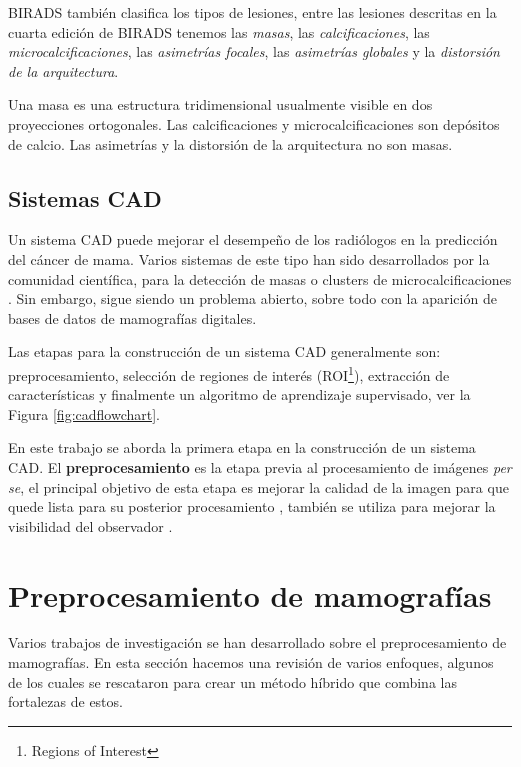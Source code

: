 BIRADS también clasifica los tipos de lesiones, entre las lesiones descritas en
la cuarta edición de BIRADS tenemos las \textit{masas}, las
\textit{calcificaciones}, las \textit{microcalcificaciones}, las
\textit{asimetrías focales}, las \textit{asimetrías globales} y la
\textit{distorsión de la arquitectura}. 

Una masa es una estructura tridimensional usualmente visible en dos
proyecciones ortogonales. Las calcificaciones y microcalcificaciones son
depósitos de calcio. Las asimetrías y la distorsión de la arquitectura no son
masas.

\subsection{Sistemas CAD}

Un sistema CAD puede mejorar el desempeño de los radiólogos en la predicción
del cáncer de mama. Varios sistemas de este tipo han sido desarrollados por la
comunidad científica, para la detección de masas \cite{bellotti2006completely}
o clusters de microcalcificaciones \cite{yu2000cad}. Sin embargo, sigue siendo
un problema abierto, sobre todo con la aparición de bases de datos de
mamografías digitales.

\cite{bozek2009survey}

Las etapas para la construcción de un sistema CAD generalmente son:
preprocesamiento, selección de regiones de interés (ROI\footnote{Regions of
Interest}), extracción de características y finalmente un algoritmo de
aprendizaje supervisado, ver la Figura \ref{fig:cadflowchart}.

\shorthandoff{>} %
    
\shorthandon{>} 

En este trabajo se aborda la primera etapa en la construcción de un sistema
CAD. El \textbf{preprocesamiento} es la etapa previa al procesamiento de
imágenes \textit{per se}, el principal objetivo de esta etapa es mejorar la
calidad de la imagen para que quede lista para su posterior procesamiento
\cite{ponraj2011survey}, también se utiliza para mejorar la visibilidad del
observador \cite{rahmati2010new}. 

\section{Preprocesamiento de mamografías}

Varios trabajos de investigación se han desarrollado sobre el preprocesamiento
de mamografías. En esta sección hacemos una revisión de varios enfoques,
algunos de los cuales se rescataron para crear un método híbrido que combina
las fortalezas de estos. 

